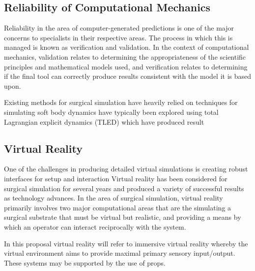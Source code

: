 \subsection{Reliability of Computational Mechanics}

Reliability in the area of computer-generated predictions is one of the major concerns to specialists in their respective areas. The process in which this is managed is known as verification and validation. In the context of computational mechanics, validation relates to determining the appropriateness of the scientific principles and mathematical models used, and verification relates to determining if the final tool can correctly produce results consistent with the model it is based upon. \cite{Tinsley2003}

Existing methods for surgical simulation have heavily relied on techniques for simulating soft body dynamics have typically been explored using total Lagrangian explicit dynamics (TLED) which have produced result  

\subsection{Virtual Reality}

One of the challenges in producing detailed virtual simulations is creating robust interfaces for setup and interaction Virtual reality has been considered for surgical simulation for several years and produced a variety of successful results as technology advances. In the area of surgical simulation, virtual reality primarily involves two major computational areas that are the simulating a surgical substrate that must be virtual but realistic, and providing a means by which an operator can interact reciprocally with the system. \cite{Spicer2004}

In this proposal virtual reality will refer to immersive virtual reality whereby the virtual environment aims to provide maximal primary sensory input/output. These systems may be supported by the use of props.